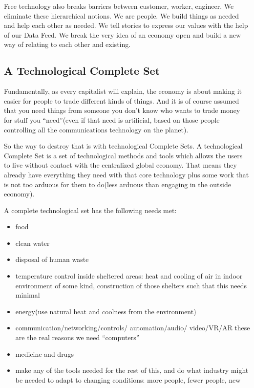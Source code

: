 Free technology also breaks barriers between customer, worker, engineer.
We eliminate these hierarchical notions. We are people. We build things
as needed and help each other as needed. We tell stories to express our
values with the help of our Data Feed. We break the very idea of an
economy open and build a new way of relating to each other and existing.

\subsection{A Technological Complete
Set}\label{a-technological-complete-set}

Fundamentally, as every capitalist will explain, the economy is about
making it easier for people to trade different kinds of things. And it
is of course assumed that you need things from someone you don't know
who wants to trade money for stuff you ``need''(even if that need is
artificial, based on those people controlling all the communications
technology on the planet).

So the way to destroy that is with technological Complete Sets. A
technological Complete Set is a set of technological methods and tools
which allows the users to live without contact with the centralized
global economy. That means they already have everything they need with
that core technology plus some work that is not too arduous for them to
do(less arduous than engaging in the outside economy).

A complete technological set has the following needs met:

\begin{itemize}
\tightlist
\item
  food
\item
  clean water
\item
  disposal of human waste
\item
  temperature control inside sheltered areas: heat and cooling of air in
  indoor environment of some kind, construction of those shelters such
  that this needs minimal\\
\item
  energy(use natural heat and coolness from the environment)
\item
  communication/networking/controls/ automation/audio/ video/VR/AR these
  are the real reasons we need ``computers''
\item
  medicine and drugs
\item
  make any of the tools needed for the rest of this, and do what
  industry might be needed to adapt to changing conditions: more people,
  fewer people, new
\end{itemize}

